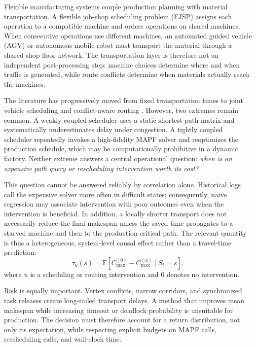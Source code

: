 \documentclass[11pt,a4paper]{article}
\newcommand{\cmax}{C_{\max}}
\newcommand{\E}{\mathbb{E}}
\begin{document}
Flexible manufacturing systems couple production planning with material
transportation. A flexible job-shop scheduling problem (FJSP) assigns each
operation to a compatible machine and orders operations on shared machines.
When consecutive operations use different machines, an automated guided vehicle
(AGV) or autonomous mobile robot must transport the material through a shared
shop-floor network. The transportation layer is therefore not an independent
post-processing step: machine choices determine where and when traffic is
generated, while route conflicts determine when materials actually reach the
machines.

The literature has progressively moved from fixed transportation times to
joint vehicle scheduling and conflict-aware routing
\citep{berterottiere2024,sun2023,leet2025,li2026,moinuddin2026}.
However, two extremes remain common. A weakly coupled scheduler uses a static
shortest-path matrix and systematically underestimates delay under congestion.
A tightly coupled scheduler repeatedly invokes a high-fidelity MAPF solver and
reoptimizes the production schedule, which may be computationally prohibitive
in a dynamic factory. Neither extreme answers a central operational question:
\emph{when is an expensive path query or rescheduling intervention worth its
cost?}

This question cannot be answered reliably by correlation alone. Historical
logs call the expensive solver more often in difficult states; consequently,
naive regression may associate intervention with poor outcomes even when the
intervention is beneficial. In addition, a locally shorter transport does not
necessarily reduce the final makespan unless the saved time propagates to a
starved machine and then to the production critical path. The relevant quantity
is thus a heterogeneous, system-level causal effect rather than a travel-time
prediction:
\begin{equation}
    \tau_u(s)
    =
    \E\!\left[
        \cmax^{(0)}-\cmax^{(u)}
        \mid S_t=s
    \right],
    \label{eq:cate_intro}
\end{equation}
where \(u\) is a scheduling or routing intervention and \(0\) denotes no
intervention.

Risk is equally important. Vertex conflicts, narrow corridors, and synchronized
task releases create long-tailed transport delays. A method that improves mean
makespan while increasing timeout or deadlock probability is unsuitable for
production. The decision must therefore account for a return distribution, not
only its expectation, while respecting explicit budgets on MAPF calls,
rescheduling calls, and wall-clock time.
\end{document}
